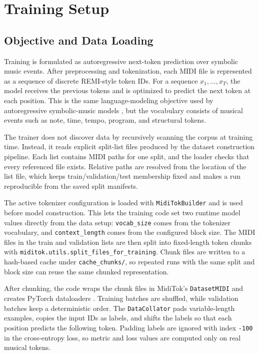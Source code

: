 \section{Training Setup}

\subsection{Objective and Data Loading}

Training is formulated as autoregressive next-token prediction over symbolic music events. After preprocessing and tokenization, each MIDI file is represented as a sequence of discrete REMI-style token IDs. For a sequence \(x_1, \ldots, x_T\), the model receives the previous tokens and is optimized to predict the next token at each position. This is the same language-modeling objective used by autoregressive symbolic-music models \citep{huangPopMusicTransformer2020,hsiaoCompoundWordTransformer2021}, but the vocabulary consists of musical events such as note, time, tempo, program, and structural tokens.

The trainer does not discover data by recursively scanning the corpus at training time. Instead, it reads explicit split-list files produced by the dataset construction pipeline. Each list contains MIDI paths for one split, and the loader checks that every referenced file exists. Relative paths are resolved from the location of the list file, which keeps train/validation/test membership fixed and makes a run reproducible from the saved split manifests.

The active tokenizer configuration is loaded with \verb|MidiTokBuilder| and is used before model construction. This lets the training code set two runtime model values directly from the data setup: \verb|vocab_size| comes from the tokenizer vocabulary, and \verb|context_length| comes from the configured block size. The MIDI files in the train and validation lists are then split into fixed-length token chunks with \verb|miditok.utils.split_files_for_training|. Chunk files are written to a hash-based cache under \verb|cache_chunks/|, so repeated runs with the same split and block size can reuse the same chunked representation.

After chunking, the code wraps the chunk files in MidiTok's \verb|DatasetMIDI| and creates PyTorch dataloaders \citep{paszkeAutomaticDifferentiationPyTorch2017}. Training batches are shuffled, while validation batches keep a deterministic order. The \verb|DataCollator| pads variable-length examples, copies the input IDs as labels, and shifts the labels so that each position predicts the following token. Padding labels are ignored with index \verb|-100| in the cross-entropy loss, so metric and loss values are computed only on real musical tokens.

